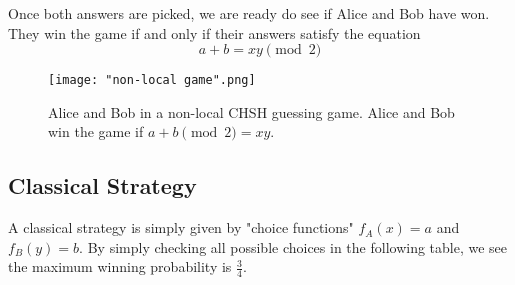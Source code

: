 Once both answers are picked, we are ready do see if Alice and Bob have won.  They win the game if and only if their answers satisfy the equation
\begin{equation*}
 a+b =xy \pmod{2}
\end{equation*}






\begin{figure}[h]
    \centering
    \texttt{[image: "non-local game".png]}
    \caption{Alice and Bob in a non-local CHSH guessing game. Alice and Bob win the game if $a+b \pmod{2} =xy$.}
    \label{fig:non-local game}
\end{figure}



\subsection{Classical Strategy}

A classical strategy is simply given by "choice functions" $f_A(x)=a$ and $f_B(y)=b$. By simply checking all possible choices in the following table, we see the maximum winning probability is $\frac{3}{4}$.

